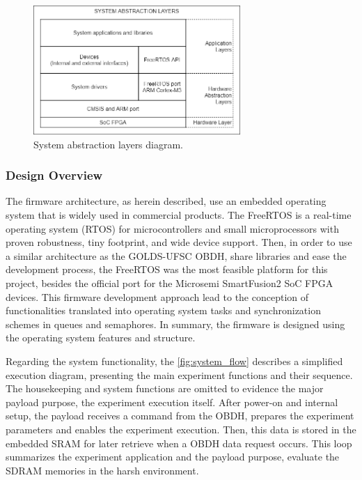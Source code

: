 \begin{figure}[!ht]
    \begin{center}
        \includegraphics[width=0.7\textwidth]{figures/abstraction_layers.png}
        \caption{System abstraction layers diagram.}
        \label{fig:abstraction_layers}
    \end{center}
\end{figure}



\subsubsection{Design Overview}

The firmware architecture, as herein described, use an embedded operating system that is widely used in commercial products. The FreeRTOS is a real-time operating system (RTOS) for microcontrollers and small microprocessors with proven robustness, tiny footprint, and wide device support. Then, in order to use a similar architecture as the GOLDS-UFSC OBDH, share libraries and ease the development process, the FreeRTOS was the most feasible platform for this project, besides the official port for the Microsemi SmartFusion2 SoC FPGA devices. This firmware development approach lead to the conception of functionalities translated into operating system tasks and synchronization schemes in queues and semaphores. In summary, the firmware is designed using the operating system features and structure. 

Regarding the system functionality, the \autoref{fig:system_flow} describes a simplified execution diagram, presenting the main experiment functions and their sequence. The housekeeping and system functions are omitted to evidence the major payload purpose, the experiment execution itself. After power-on and internal setup, the payload receives a command from the OBDH, prepares the experiment parameters and enables the experiment execution. Then, this data is stored in the embedded SRAM for later retrieve when a OBDH data request occurs. This loop summarizes the experiment application and the payload purpose, evaluate the SDRAM memories in the harsh environment.

